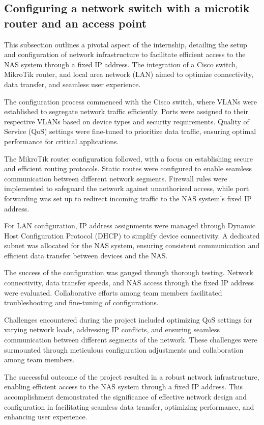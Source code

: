 \subsection{Configuring a network switch with a microtik router and an access point}
This subsection outlines a pivotal aspect of the internship, detailing the setup and configuration of network infrastructure to facilitate efficient access to the NAS system through a fixed IP address. The integration of a Cisco switch, MikroTik router, and local area network (LAN) aimed to optimize connectivity, data transfer, and seamless user experience.

The configuration process commenced with the Cisco switch, where VLANs were established to segregate network traffic efficiently. Ports were assigned to their respective VLANs based on device types and security requirements. Quality of Service (QoS) settings were fine-tuned to prioritize data traffic, ensuring optimal performance for critical applications.

The MikroTik router configuration followed, with a focus on establishing secure and efficient routing protocols. Static routes were configured to enable seamless communication between different network segments. Firewall rules were implemented to safeguard the network against unauthorized access, while port forwarding was set up to redirect incoming traffic to the NAS system's fixed IP address.

For LAN configuration, IP address assignments were managed through Dynamic Host Configuration Protocol (DHCP) to simplify device connectivity. A dedicated subnet was allocated for the NAS system, ensuring consistent communication and efficient data transfer between devices and the NAS.

The success of the configuration was gauged through thorough testing. Network connectivity, data transfer speeds, and NAS access through the fixed IP address were evaluated. Collaborative efforts among team members facilitated troubleshooting and fine-tuning of configurations.

Challenges encountered during the project included optimizing QoS settings for varying network loads, addressing IP conflicts, and ensuring seamless communication between different segments of the network. These challenges were surmounted through meticulous configuration adjustments and collaboration among team members.

The successful outcome of the project resulted in a robust network infrastructure, enabling efficient access to the NAS system through a fixed IP address. This accomplishment demonstrated the significance of effective network design and configuration in facilitating seamless data transfer, optimizing performance, and enhancing user experience.
